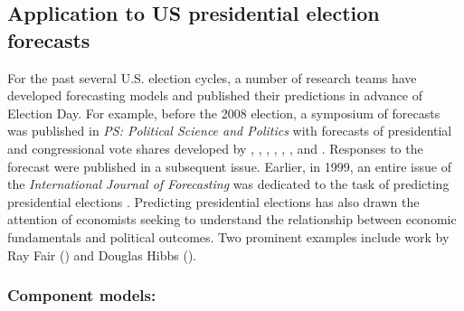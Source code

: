 \documentclass[12pt,fullpage]{article}
\begin{document}
\subsection{Application to US presidential election forecasts}
For the past several U.S. election cycles, a number of research teams
have developed forecasting models and published their predictions in
advance of Election Day.  For example, before the 2008 election, a
symposium of forecasts was published in \emph{PS: Political Science
  and Politics} with forecasts of presidential and congressional vote
shares developed by \citet{Campbell:2008}, \citet{Norpoth:2008},
\citet{Lewis-Beck:Tien:2008}, \citet{Abramowitz:2008},
\citet{Erikson:Wlezien:2008}, \citet{Holbrook:2008},
\citet{Lockerbie:2008} and \citet{Cuzan:Bundrick:2008}.  Responses to
the forecast were published in a subsequent issue. Earlier, in 1999,
an entire issue of the \textit{International Journal of Forecasting}
was dedicated to the task of predicting presidential elections
\citep{Brown:1999}.  Predicting presidential elections has also drawn
the attention of economists seeking to understand the relationship
between economic fundamentals and political outcomes.  Two prominent
examples include work by Ray Fair (\citeyear{Fair:2010}) and Douglas
Hibbs (\citeyear{Hibbs:2000}).

\subsubsection{Component models:}
\end{document}
